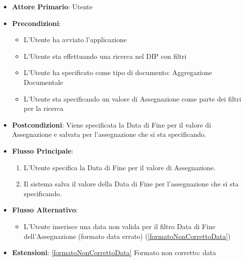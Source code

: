 \begin{itemize}
      \item \textbf{Attore Primario}: Utente
      \item \textbf{Precondizioni}: 
      \begin{itemize}
            \item L'Utente ha avviato l'applicazione
            \item L'Utente sta effettuando una ricerca nel DIP con filtri
            \item L'Utente ha specificato come tipo di documento: Aggregazione Documentale
            \item L'Utente sta specificando un valore di Assegnazione come parte dei filtri per la ricerca
      \end{itemize}
      \item \textbf{Postcondizioni}: Viene specificata la Data di Fine per il valore di Assegnazione e salvata per l'assegnazione che si sta specificando.
      \item \textbf{Flusso Principale}:
      \begin{enumerate}
            \item L'Utente specifica la Data di Fine per il valore di Assegnazione.
            \item Il sistema salva il valore della Data di Fine per l'assegnazione che si sta specificando.
      \end{enumerate}
      \item \textbf{Flusso Alternativo}:
      \begin{itemize}
            \item L'Utente inserisce una data non valida per il filtro Data di Fine dell'Assegnazione (formato data errato) (\ref{formatoNonCorrettoData})
      \end{itemize}
      \item \textbf{Estensioni}: \ref{formatoNonCorrettoData} Formato non corretto: data
\end{itemize}
      
